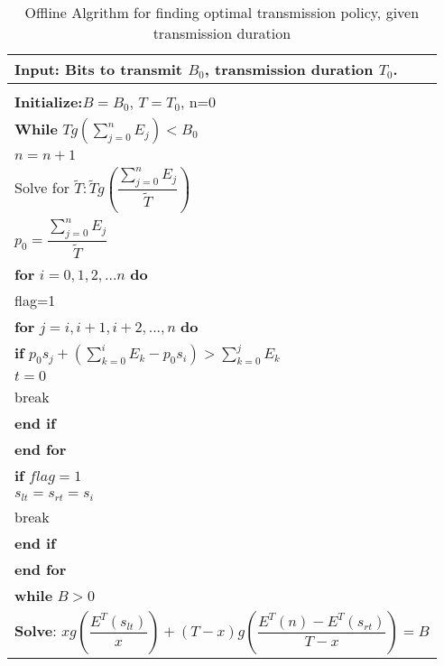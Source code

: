 \begin{table}
\begin{minipage}[b]{8cm}
\caption{Offline Algrithm for finding optimal transmission policy, given transmission duration}
\begin{tabular}{p{7cm}}
\hline \textbf{Input}: Bits to transmit $B_0$, transmission duration $T_0$.\\
\hline
\\
\textbf{Initialize:}$B = B_0$, $T = T_0$, n=0
\\
\textbf{While} $Tg(\sum_{j=0}^n E_j) < B_0$
\\
\hspace{4mm} $n = n+1$
\\
Solve for $\tilde{T}: \tilde{T}g(\dfrac{\sum_{j=0}^n E_j}{\tilde{T}})$
\\
$p_0=\dfrac{\sum_{j=0}^n E_j}{\tilde{T}}$
\\
\textbf{for} $i=0,1,2,...n$ \textbf{do}
\\
\hspace{4mm}flag=1
\\
\hspace{4mm}\textbf{for} $j=i,i+1,i+2,...,n$ \textbf{do}
\\
\hspace{7mm}\textbf{if} $p_0s_j + (\sum_{k=0}^i E_k - p_0s_i) > \sum_{k=0}^j E_k$
\\
\hspace{10mm}$t=0$
\\
\hspace{10mm}break
\\
\hspace{7mm}\textbf{end if}
\\
\hspace{4mm}\textbf{end for}
\\
\hspace{4mm}\textbf{if} $flag=1$
\\
\hspace{7mm}$s_{lt} = s_{rt} = s_i$
\\
\hspace{7mm}break
\\
\hspace{4mm}\textbf{end if}
\\
\textbf{end for}
\\
\textbf{while} $B>0$
\\
\hspace{4mm}\textbf{Solve}: $xg(\dfrac{E^T(s_{lt})}{x})+(T-x)g(\dfrac{E^T(n)-E^T(s_{rt})}{T-x}) = B$
\\

\end{tabular}
\end{minipage}
\end{table}
